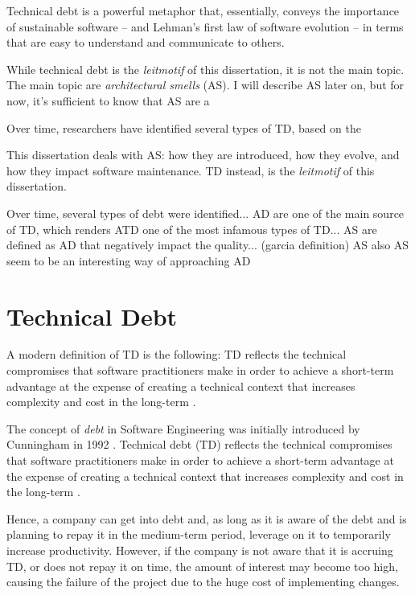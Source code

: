 Technical debt is a powerful metaphor that, essentially, conveys the importance of sustainable software -- and Lehman's first law of software evolution -- in terms that are easy to understand and communicate to others. 

While technical debt is the \emph{leitmotif} of this dissertation, it is not the main topic.
The main topic are \emph{architectural smells} (AS).  I will describe AS later on, but for now, it's sufficient to know that AS are a 


Over time, researchers have identified several types of TD, based on the 


This dissertation deals with AS: how they are introduced, how they evolve, and how they impact software maintenance.
TD instead, is the \emph{leitmotif} of this dissertation.



Over time, several types of debt were identified... 
AD are one of the main source of TD, which renders ATD one of the most infamous types of TD...
AS are defined as AD that negatively impact the quality... (garcia definition)
AS also 
AS seem to be an interesting way of approaching AD 



\section{Technical Debt}
A modern definition of TD is the following: TD reflects the technical compromises that software practitioners make in order to achieve a short-term advantage at the expense of creating a technical context that increases complexity and cost in the long-term \cite{Avgeriou2016}. 

The concept of \textit{debt} in Software Engineering was initially introduced by Cunningham in 1992 \cite{Cunningham1992}.
Technical debt (TD) reflects the technical compromises that software practitioners make in order to achieve a short-term advantage at the expense of creating a technical context that increases complexity and cost in the long-term \cite{Avgeriou2016}.  

Hence, a company can get into debt and, as long as it is aware of the debt and is planning to repay it in the medium-term period, leverage on it to temporarily increase productivity.
However, if the company is not aware that it is accruing TD, or does not repay it on time, the amount of interest may become too high, causing the failure of the project due to the huge cost of implementing changes.


